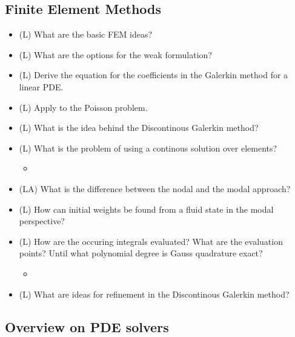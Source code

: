 \subsection*{Finite Element Methods}

\begin{itemize}
    \item (L) What are the basic FEM ideas?
    \answerboxM
    \item (L) What are the options for the weak formulation?
    \answerboxM
    \item (L) Derive the equation for the coefficients in the Galerkin method for a linear PDE.
    \answerboxM
    \item (L) Apply to the Poisson problem.
    \answerboxL
    \item (L) What is the idea behind the Discontinous Galerkin method?
    \answerboxM
    \item (L) What is the problem of using a continous solution over elements?
    \begin{itemize}
        \item {}
    \end{itemize}
    \answerboxS
    \item (LA) What is the difference between the nodal and the modal approach?
    \answerboxS
    \item (L) How can initial weights be found from a fluid state in the modal perspective?
    \answerboxM
    \item (L) How are the occuring integrals evaluated? What are the evaluation points? Until what polynomial
    degree is Gauss quadrature exact?
    \begin{itemize}
        \item {}
    \end{itemize}
    \answerboxL
    \item (L) What are ideas for refinement in the Discontinous Galerkin method?
    \answerboxM
\end{itemize}

\subsection*{Overview on PDE solvers}

